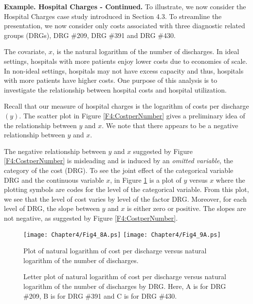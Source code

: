 \linejed

\textbf{Example. Hospital Charges - Continued.} To illustrate, we
now consider the Hospital Charges case study introduced in Section
4.3. To streamline the presentation, we now consider only costs
associated with three diagnostic related groups (DRGs), DRG \#209,
DRG \#391 and DRG \#430.

The covariate, $x$, is the natural logarithm of the number of
discharges. In ideal settings, hospitals with more patients enjoy
lower costs due to economies of scale. In non-ideal settings,
hospitals may not have excess capacity and thus, hospitals with more
patients have higher costs. One purpose of this analysis is to
investigate the relationship between hospital costs and hospital
utilization.

Recall that our measure of hospital charges is the logarithm of
costs per discharge $(y)$. The scatter plot in Figure
\ref{F4:CostperNumber} gives a preliminary idea of the relationship
between $y$ and $x$. We note that there appears to be a negative
relationship between $y$ and $x$.

The negative relationship between $y$ and $x$ suggested by Figure
\ref{F4:CostperNumber} is misleading and is induced by an
\textit{omitted variable}, the category of the cost (DRG). To see
the joint effect of the categorical variable DRG and the continuous
variable $x$, in Figure \ref{F4:DRGbyNumber} is a plot of $y$ versus
$x$ where the plotting symbols are codes for the level of the
categorical variable. From this plot, we see that the level of cost
varies by level of the factor DRG. Moreover, for each level of DRG,
the slope between $y$ and $x$ is either zero or positive. The slopes
are not negative, as suggested by Figure \ref{F4:CostperNumber}.

\begin{figure}[htp]
  \begin{center}
    \texttt{[image: Chapter4/Fig4\_8A.ps]}
    \texttt{[image: Chapter4/Fig4\_9A.ps]} \hfill
    \parbox[t]{2.5in}{\caption{\label{F4:CostperNumber} \small  Plot of natural logarithm of cost per discharge versus natural
logarithm of the number of discharges.}} \hfill
    \parbox[t]{2.5in}{\caption{\label{F4:DRGbyNumber} \small  Letter plot of natural logarithm of cost per discharge versus natural
logarithm of the number of discharges by DRG. Here, A is for DRG
\#209, B is for DRG \#391 and C is for DRG \#430.}}
  \end{center}
\end{figure}


